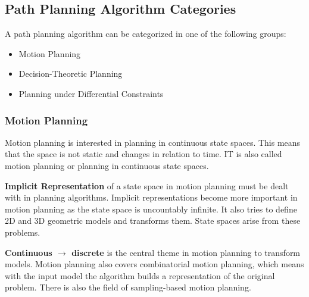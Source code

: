 \cite{planning_algorithms_steven_m_lavalle}

\subsection{Path Planning Algorithm Categories}
A path planning algorithm can be categorized in one of the following groups:
\begin{itemize}
    \item Motion Planning
    \item Decision-Theoretic Planning
    \item Planning under Differential Constraints
\end{itemize}

\subsubsection{Motion Planning}

Motion planning is interested in planning in continuous state spaces. This means that the space is not static and changes in relation to time. IT is also called motion planning or planning in continuous state spaces.

\textbf{Implicit Representation} of a state space in motion planning must be dealt with in planning algorithms. Implicit representations become more important in motion planning as the state space is uncountably infinite. It also tries to define 2D and 3D geometric models and transforms them. State spaces arise from these problems.

\textbf{Continuous $\rightarrow$ discrete} is the central theme in motion planning to transform models. Motion planning also covers combinatorial motion planning, which means with the input model the algorithm builds a representation of the original problem. There is also the field of sampling-based motion planning.

